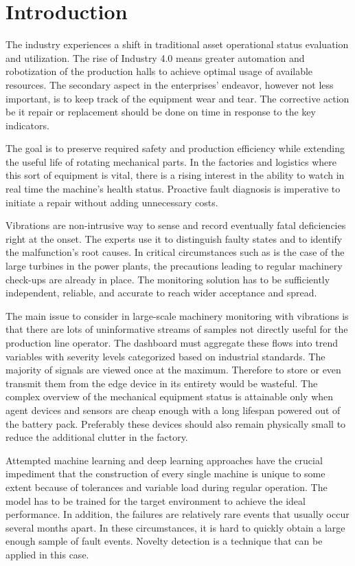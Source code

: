 \chapter{Introduction}
The industry experiences a shift in traditional asset operational status evaluation and utilization. The rise of Industry 4.0 means greater automation and robotization of the production halls to achieve optimal usage of available resources. The secondary aspect in the enterprises' endeavor, however not less important, is to keep track of the equipment wear and tear. The corrective action be it repair or replacement should be done on time in response to the key indicators.

The goal is to preserve required safety and production efficiency while extending the useful life of rotating mechanical parts. In the factories and logistics where this sort of equipment is vital, there is a rising interest in the ability to watch in real time the machine's health status. Proactive fault diagnosis is imperative to initiate a repair without adding unnecessary costs.

Vibrations are non-intrusive way to sense and record eventually fatal deficiencies right at the onset. The experts use it to distinguish faulty states and to identify the malfunction's root causes. In critical circumstances such as is the case of the large turbines in the power plants, the precautions leading to regular machinery check-ups are already in place. The monitoring solution has to be sufficiently independent, reliable, and accurate to reach wider acceptance and spread.

The main issue to consider in large-scale machinery monitoring with vibrations is that there are lots of uninformative streams of samples not directly useful for the production line operator. The dashboard must aggregate these flows into trend variables with severity levels categorized based on industrial standards. The majority of signals are viewed once at the maximum. Therefore to store or even transmit them from the edge device in its entirety would be wasteful. The complex overview of the mechanical equipment status is attainable only when agent devices and sensors are cheap enough with a long lifespan powered out of the battery pack. Preferably these devices should also remain physically small to reduce the additional clutter in the factory.

Attempted machine learning and deep learning approaches have the crucial impediment that the construction of every single machine is unique to some extent because of tolerances and variable load during regular operation. The model has to be trained for the target environment to achieve the ideal performance. In addition, the failures are relatively rare events that usually occur several months apart. In these circumstances, it is hard to quickly obtain a large enough sample of fault events. Novelty detection is a technique that can be applied in this case.

